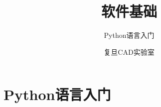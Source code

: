 \documentclass[zihao=-4,twoside]{ctexbook}
\begin{document}
\title{软件基础}
\subtitle{Python语言入门}
\author{复旦CAD实验室}
\makecover
\tableofcontents
\newpage

\chapter{Python语言入门}





\end{document}
